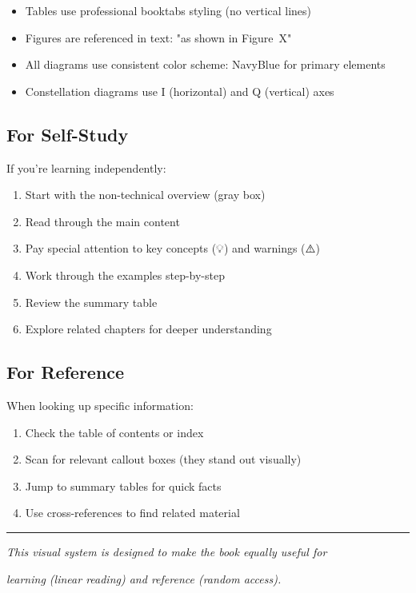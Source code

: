 \begin{itemize}
\item Tables use professional booktabs styling (no vertical lines)
\item Figures are referenced in text: "as shown in Figure~X"
\item All diagrams use consistent color scheme: NavyBlue for primary elements
\item Constellation diagrams use I (horizontal) and Q (vertical) axes
\end{itemize}

\subsection*{For Self-Study}

If you're learning independently:

\begin{enumerate}
\item Start with the non-technical overview (gray box)
\item Read through the main content
\item Pay special attention to key concepts (💡) and warnings (⚠️)
\item Work through the examples step-by-step
\item Review the summary table
\item Explore related chapters for deeper understanding
\end{enumerate}

\subsection*{For Reference}

When looking up specific information:

\begin{enumerate}
\item Check the table of contents or index
\item Scan for relevant callout boxes (they stand out visually)
\item Jump to summary tables for quick facts
\item Use cross-references to find related material
\end{enumerate}

\vspace{1cm}

\begin{center}
\rule{0.5\linewidth}{0.5pt}

\textit{This visual system is designed to make the book equally useful for}

\textit{learning (linear reading) and reference (random access).}
\end{center}
